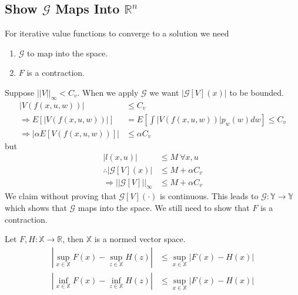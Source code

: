 \subsection{Show $\mathcal{G}$ Maps Into $\mathbb{R}^n$}
For iterative value functions to converge to a solution we need
\begin{enumerate}
\item $\mathcal{G}$ to map into the space.
\item $F$ is a contraction.
\end{enumerate}
Suppose $||V||_\infty<C_v$.
When we apply $\mathcal{G}$ we want $|\mathcal{G}[V](x)|$ to be bounded.
\begin{align*}
|V(f(x,u,w))| &\leq C_v \\
\Rightarrow E[|V(f(x,u,w))|] &= E[\int|V(f(x,u,w))|p_w(w)dw] \leq C_v \\
\Rightarrow |\alpha E[V(f(x,u,w))]| &\leq \alpha C_v
\end{align*}
but
\begin{align*}
|l(x,u)| &\leq M~\forall x,u \\
\therefore |\mathcal{G}[V](x)| &\leq M + \alpha C_v \\
\Rightarrow ||\mathcal{G}[V]||_\infty &\leq M + \alpha C_v
\end{align*}
We claim without proving that $\mathcal{G}[V](\cdot)$ is continuous.
This leads to $\mathcal{G}:\mathbb{Y}\to\mathbb{Y}$ which shows that $\mathcal{G}$ maps into the space.
We still need to show that $F$ is a contraction.

\begin{theorem}
\label{th:nvs}
Let $F,H:\mathbb{X}\to\mathbb{R}$, then $\mathbb{X}$ is a normed vector space.
\begin{align*}
|\sup_{x\in\mathbb{X}}F(x) - \sup_{z\in\mathbb{X}}H(z)| &\leq \sup_{x\in\mathbb{X}}|F(x)-H(x)| \\
|\inf_{x\in\mathbb{X}}F(x) - \inf_{z\in\mathbb{X}}H(z)| &\leq \sup_{x\in\mathbb{X}}|F(x)-H(x)|
\end{align*}
\end{theorem}

